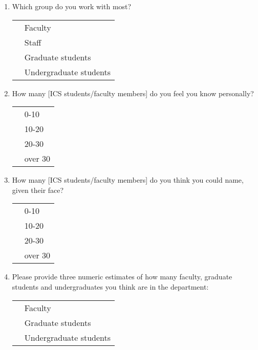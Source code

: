\begin{enumerate}

\item{Which group do you work with most?}\\
  \begin{tabular}{ll}
    \underline{  }\underline{  }\underline{  }  & Faculty \\
    \underline{  }\underline{  }\underline{  }  & Staff \\
    \underline{  }\underline{  }\underline{  }  & Graduate students \\
    \underline{  }\underline{  }\underline{  }  & Undergraduate students \\
  \end{tabular}

\item{How many [ICS students/faculty members] do you feel you know
  personally?}\\
  \begin{tabular}{ll}
    \underline{  }\underline{  }\underline{  }  & 0-10 \\
    \underline{  }\underline{  }\underline{  }  & 10-20 \\
    \underline{  }\underline{  }\underline{  }  & 20-30 \\
    \underline{  }\underline{  }\underline{  }  & over 30 \\
  \end{tabular}

\item{How many [ICS students/faculty members] do you think you could name,
  given their face?}\\
  \begin{tabular}{ll}
    \underline{  }\underline{  }\underline{  }  & 0-10 \\
    \underline{  }\underline{  }\underline{  }  & 10-20 \\
    \underline{  }\underline{  }\underline{  }  & 20-30 \\
    \underline{  }\underline{  }\underline{  }  & over 30 \\
  \end{tabular}

\item{Please provide three numeric estimates of how many faculty, graduate
  students and  undergraduates you think are in the department:}\\
  \begin{tabular}{ll}
    \underline{  }\underline{  }\underline{  }  & Faculty \\
    \underline{  }\underline{  }\underline{  }  & Graduate students \\
    \underline{  }\underline{  }\underline{  }  & Undergraduate students \\
  \end{tabular}


\end{enumerate}
